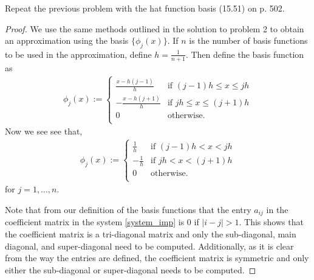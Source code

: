 \begin{problem}
  Repeat the previous problem with the hat function basis (15.51) on p. 502.
\end{problem}

\begin{proof}
  We use the same methods outlined in the solution to problem 2 to obtain an
  approximation using the basis $\{\phi_j(x) \}$. If $n$ is the number of basis functions
  to be used in the approximation, define $h = \frac{1}{n+1}$. Then define the basis function
  as
  \begin{align*}
    \phi_j(x) :=
    \begin{cases}
      \frac{x - h(j-1)}{h} & \text{if $(j-1)h \leq x \leq jh$} \\
      -\frac{x - h(j+1)}{h} & \text{if $jh \leq x \leq (j + 1)h$} \\
      0 & \text{otherwise}. \\
    \end{cases}
  \end{align*}
  Now we see see that,
  \begin{align*}
    \phi_j(x) :=
    \begin{cases}
      \frac{1}{h} & \text{if $(j-1)h < x < jh$} \\
      -\frac{1}{h} & \text{if $jh < x < (j + 1)h$} \\
      0 & \text{otherwise}. \\
    \end{cases}
  \end{align*}
  for $j=1,\dots,n$.

  Note that from our definition of the basis functions that the entry $a_{ij}$
  in the coefficient matrix in the system \eqref{system_imp} is 0 if $|i - j| > 1$.
  This shows that the coefficient matrix is a tri-diagonal matrix and only
  the sub-diagonal, main diagonal, and super-diagonal need to be computed. Additionally,
  as it is clear from the way the entries are defined, the coefficient matrix
  is symmetric and only either the sub-diagonal or super-diagonal needs to be computed.


\end{proof}
